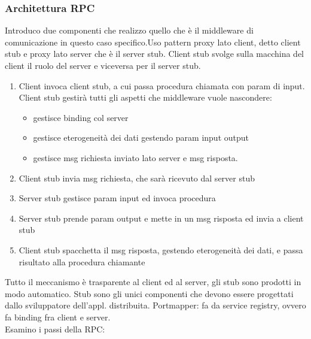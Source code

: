 \documentclass{article}
\begin{document}
\subsubsection{Architettura RPC}
Introduco due componenti che realizzo quello che è il middleware di comunicazione in questo caso specifico.Uso pattern proxy lato client, detto client stub e proxy lato server che è il server stub. Client stub svolge sulla macchina del client il ruolo del server e viceversa per il server stub.
\begin{enumerate}
\item Client invoca client stub, a cui passa procedura chiamata con param di input. Client stub gestirà tutti gli aspetti che middleware vuole nascondere:
\begin{itemize}
\item gestisce binding col server
\item gestisce eterogeneità dei dati gestendo param input output
\item gestisce msg richiesta inviato lato server e msg risposta.
\end{itemize}
\item Client stub invia msg richiesta, che sarà ricevuto dal server stub
\item Server stub gestisce param input ed invoca procedura
\item Server stub prende param output e mette in un msg risposta ed invia a client stub
\item Client stub spacchetta il msg risposta, gestendo eterogeneità dei dati, e passa risultato alla procedura chiamante
\end{enumerate}
Tutto il meccanismo è trasparente al client ed al server, gli stub sono prodotti in modo automatico. Stub sono gli unici componenti che devono essere progettati dallo sviluppatore dell'appl. distribuita. Portmapper: fa da service registry, ovvero fa binding fra client e server.\\ Esamino i passi della RPC:
\end{document}
